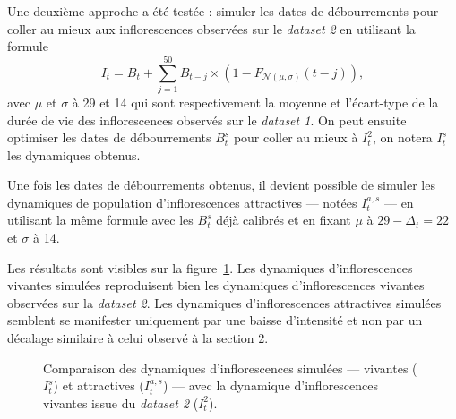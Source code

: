 \documentclass[a4paper, 11pt]{article}
\begin{document}
Une deuxième approche a été testée : simuler les dates de débourrements pour coller au mieux aux inflorescences observées sur le \textit{dataset 2} en utilisant la formule
$$I_t = B_t + \sum_{j = 1}^{50} B_{t-j}\times \left( 1 - F_{\mathcal{N}\left( \mu, \sigma \right)}(t-j) \right),$$
avec $\mu$ et $\sigma$ à 29 et 14 qui sont respectivement la moyenne et l’écart-type de la durée de vie des inflorescences observés sur le \textit{dataset 1}. On peut ensuite optimiser les dates de débourrements $B_t^s$ pour coller au mieux à $I_t^2$, on notera $I_t^s$ les dynamiques obtenus.

Une fois les dates de débourrements obtenus, il devient possible de simuler les dynamiques de population d’inflorescences
attractives --- notées $I_t^{a, s}$ --- en utilisant la même formule avec les $B_t^s$ déjà calibrés et en fixant $\mu$ à $29 - \Delta_t = 22$ et $\sigma$ à 14.


Les résultats sont visibles sur la figure~\ref{simu}. Les dynamiques d'inflorescences vivantes simulées reproduisent bien les dynamiques d'inflorescences vivantes observées sur la \textit{dataset 2}. Les dynamiques d'inflorescences attractives simulées semblent se manifester uniquement par une baisse d'intensité et non par un décalage similaire à celui observé à la section 2.

%  
% 

\begin{figure}[ht]
 \centering
 \caption{Comparaison des dynamiques d'inflorescences simulées --- vivantes ($I_t^s$) et attractives ($I_t^{a, s}$) --- avec la dynamique d'inflorescences vivantes issue du \textit{dataset 2} ($I_t^2$).}
 \label{simu}
\end{figure}
\end{document}
